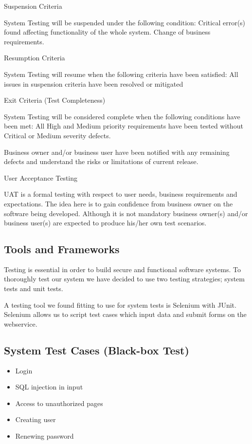 \documentclass[a4paper]{article}
\begin{document}
Suspension Criteria

System Testing will be suspended under the following condition:
Critical error(s) found affecting functionality of the whole system.
Change of business requirements.

Resumption Criteria

System Testing will resume when the following criteria have been satisfied:
All issues in suspension criteria have been resolved or mitigated

Exit Criteria (Test Completeness)

System Testing will be considered complete when the following conditions have been met:
All High and Medium priority requirements have been tested without Critical or Medium severity defects.

Business owner and/or business user have been notified with any remaining defects and understand the risks or limitations of current release.

User Acceptance Testing 

UAT is a formal testing with respect to user needs, business requirements and expectations.  The idea here is to gain confidence from business owner on the software being developed.  Although it is not mandatory business owner(s) and/or business user(s) are expected to produce his/her own test scenarios.
\subsection{Tools and Frameworks}
Testing is essential in order to build secure and functional software systems. To thoroughly test our system we have decided to use two testing strategies; system tests and unit tests.

A testing tool we found fitting to use for system tests is Selenium with JUnit. Selenium allows us to script test cases which input data and submit forms on the webservice.

\subsection{System Test Cases (Black-box Test)}

\begin{itemize}
\item Login
\item SQL injection in input
\item Access to unauthorized pages
\item Creating user
\item Renewing password
\end{itemize}
\end{document}
